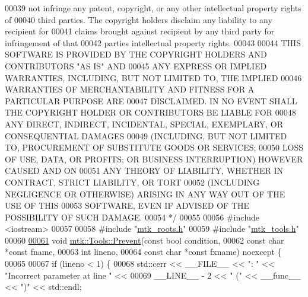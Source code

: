 \begin{DoxyCode}
00039 \textcolor{comment}{not infringe any patent, copyright, or any other intellectual property rights of}
00040 \textcolor{comment}{third parties. The copyright holders disclaim any liability to any recipient for}
00041 \textcolor{comment}{claims brought against recipient by any third party for infringement of that}
00042 \textcolor{comment}{parties intellectual property rights.}
00043 \textcolor{comment}{}
00044 \textcolor{comment}{THIS SOFTWARE IS PROVIDED BY THE COPYRIGHT HOLDERS AND CONTRIBUTORS "AS IS" AND}
00045 \textcolor{comment}{ANY EXPRESS OR IMPLIED WARRANTIES, INCLUDING, BUT NOT LIMITED TO, THE IMPLIED}
00046 \textcolor{comment}{WARRANTIES OF MERCHANTABILITY AND FITNESS FOR A PARTICULAR PURPOSE ARE}
00047 \textcolor{comment}{DISCLAIMED. IN NO EVENT SHALL THE COPYRIGHT HOLDER OR CONTRIBUTORS BE LIABLE FOR}
00048 \textcolor{comment}{ANY DIRECT, INDIRECT, INCIDENTAL, SPECIAL, EXEMPLARY, OR CONSEQUENTIAL DAMAGES}
00049 \textcolor{comment}{(INCLUDING, BUT NOT LIMITED TO, PROCUREMENT OF SUBSTITUTE GOODS OR SERVICES;}
00050 \textcolor{comment}{LOSS OF USE, DATA, OR PROFITS; OR BUSINESS INTERRUPTION) HOWEVER CAUSED AND ON}
00051 \textcolor{comment}{ANY THEORY OF LIABILITY, WHETHER IN CONTRACT, STRICT LIABILITY, OR TORT}
00052 \textcolor{comment}{(INCLUDING NEGLIGENCE OR OTHERWISE) ARISING IN ANY WAY OUT OF THE USE OF THIS}
00053 \textcolor{comment}{SOFTWARE, EVEN IF ADVISED OF THE POSSIBILITY OF SUCH DAMAGE.}
00054 \textcolor{comment}{*/}
00055 
00056 \textcolor{preprocessor}{#include <iostream>}
00057 
00058 \textcolor{preprocessor}{#include "\hyperlink{mtk__roots_8h}{mtk\_roots.h}"}
00059 \textcolor{preprocessor}{#include "\hyperlink{mtk__tools_8h}{mtk\_tools.h}"}
00060 
\hypertarget{mtk__tools_8cc_source_l00061}{}\hyperlink{classmtk_1_1Tools_a332324c6f25e66be9dff48c5987a3b9f}{00061} \textcolor{keywordtype}{void} \hyperlink{classmtk_1_1Tools_a332324c6f25e66be9dff48c5987a3b9f}{mtk::Tools::Prevent}(\textcolor{keyword}{const} \textcolor{keywordtype}{bool} condition,
00062                          \textcolor{keyword}{const} \textcolor{keywordtype}{char} *\textcolor{keyword}{const} fname,
00063                          \textcolor{keywordtype}{int} lineno,
00064                          \textcolor{keyword}{const} \textcolor{keywordtype}{char} *\textcolor{keyword}{const} fxname) noexcept \{
00065 
00067   \textcolor{keywordflow}{if} (lineno < 1) \{
00068     std::cerr << \_\_FILE\_\_ << \textcolor{stringliteral}{": "} << \textcolor{stringliteral}{"Incorrect parameter at line "} <<
00069     \_\_LINE\_\_ - 2 << \textcolor{stringliteral}{" ("} << \_\_func\_\_ << \textcolor{stringliteral}{")"} << std::endl;

\end{DoxyCode}
